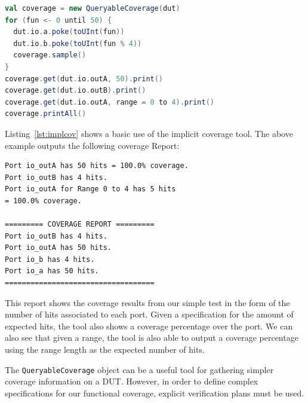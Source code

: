 \documentclass[conference]{IEEEtran}
\begin{document}
\begin{lstlisting}[captionpos=b,caption={Example use of a \texttt{QueryableCoverage} object in order to gain information about the DUT's testing process. Note that \texttt{outA} and \texttt{outB} simply output the values of \texttt{a} and \texttt{b}.},label={lst:implcov},language=scala]
val coverage = new QueryableCoverage(dut)
for (fun <- 0 until 50) {
  dut.io.a.poke(toUInt(fun))
  dut.io.b.poke(toUInt(fun % 4))
  coverage.sample()
}
coverage.get(dut.io.outA, 50).print()
coverage.get(dut.io.outB).print()
coverage.get(dut.io.outA, range = 0 to 4).print()
coverage.printAll()
\end{lstlisting}
Listing~\ref{lst:implcov} shows a basic use of the implicit coverage tool. 
The above example outputs the following coverage Report:  
\begin{verbatim}
Port io_outA has 50 hits = 100.0% coverage.
Port io_outB has 4 hits.
Port io_outA for Range 0 to 4 has 5 hits 
= 100.0% coverage.  

========= COVERAGE REPORT ========= 
Port io_outB has 4 hits.
Port io_outA has 50 hits.
Port io_b has 4 hits.
Port io_a has 50 hits.
===================================
\end{verbatim}
This report shows the coverage results from our simple test in the form of the number of hits associated to each port.
Given a specification for the amount of expected hits, the tool also shows a coverage percentage over the port.
We can also see that given a range, the tool is also able to output a coverage percentage using the range length as the expected number of hits.

The \texttt{QueryableCoverage} object can be a useful tool for gathering simpler coverage information on a DUT.
However, in order to define complex specifications for our functional coverage, explicit verification plans must be used.
\end{document}
